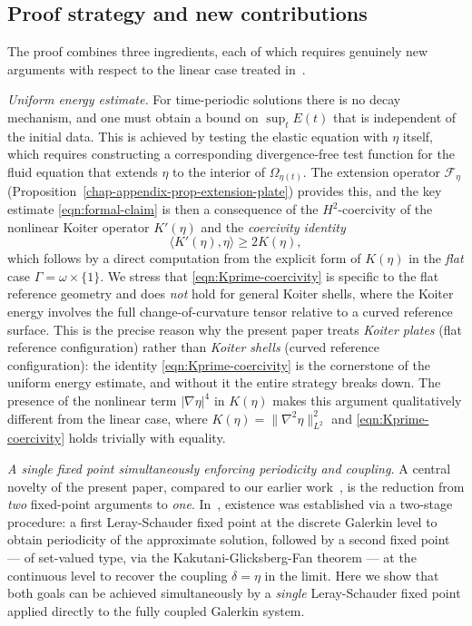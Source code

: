 \documentclass[10pt,a4paper]{article}
\numberwithin{equation}{section}
\begin{document}
\subsection{Proof strategy and new contributions}

The proof combines three ingredients, each of which requires genuinely new arguments with
respect to the linear case treated in~\cite{Claudiu22}.

\medskip
\noindent\textit{Uniform energy estimate.} For time-periodic solutions there is no
decay mechanism, and one must obtain a bound on $\sup_{t} E(t)$ that is independent
of the initial data. This is achieved by testing the elastic equation with $\eta$ itself,
which requires constructing a corresponding divergence-free test function for the fluid
equation that extends $\eta$ to the interior of $\Omega_{\eta(t)}$. The extension
operator $\mathcal{F}_\eta$ (Proposition~\ref{chap-appendix-prop-extension-plate}) provides
this, and the key estimate \eqref{eqn:formal-claim} is then a consequence of the $H^2$-coercivity
of the nonlinear Koiter operator $K'(\eta)$ and the \emph{coercivity identity}
\begin{equation}\label{eqn:Kprime-coercivity}
\langle K'(\eta), \eta \rangle \ge 2K(\eta),
\end{equation}
which follows by a direct computation from the explicit form of $K(\eta)$ in the
\emph{flat} case $\Gamma = \omega \times \{1\}$.
We stress that \eqref{eqn:Kprime-coercivity} is specific to the flat reference geometry
and does \emph{not} hold for general Koiter shells, where the Koiter energy involves
the full change-of-curvature tensor relative to a curved reference surface.
This is the precise reason why the present paper treats \emph{Koiter plates} (flat
reference configuration) rather than \emph{Koiter shells} (curved reference
configuration): the identity \eqref{eqn:Kprime-coercivity} is the cornerstone of
the uniform energy estimate, and without it the entire strategy breaks down.
The presence of the nonlinear term $|\nabla\eta|^4$ in $K(\eta)$ makes this argument
qualitatively different from the linear case, where $K(\eta) = \|\nabla^2\eta\|^2_{L^2}$
and \eqref{eqn:Kprime-coercivity} holds trivially with equality.

\medskip
\noindent\textit{A single fixed point simultaneously enforcing periodicity and coupling.}
A central novelty of the present paper, compared to our earlier work~\cite{Claudiu22},
is the reduction from \emph{two} fixed-point arguments to \emph{one}.
In~\cite{Claudiu22}, existence was established via a two-stage procedure:
a first Leray-Schauder fixed point at the discrete Galerkin level to obtain
periodicity of the approximate solution, followed by a second fixed point
— of set-valued type, via the Kakutani-Glicksberg-Fan theorem — at the continuous
level to recover the coupling $\delta = \eta$ in the limit.
Here we show that both goals can be achieved simultaneously by a \emph{single}
Leray-Schauder fixed point applied directly to the fully coupled Galerkin system.
\end{document}

